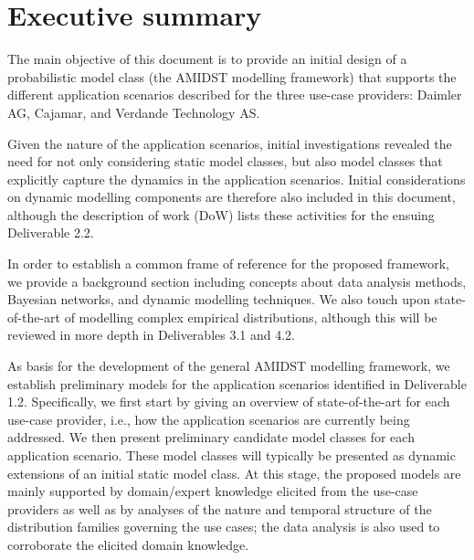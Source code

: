 \section{Executive summary}\label{section:executiveSummary}

The main objective of this document is to provide an initial design of a probabilistic model class (the AMIDST modelling
framework) that supports the different application scenarios described for the three use-case providers: Daimler AG, Cajamar, and Verdande Technology AS.



Given the nature of the application scenarios, initial investigations revealed the need for not only considering static
model classes, but also model classes that explicitly capture the  dynamics in the application scenarios. Initial considerations on
dynamic modelling components are therefore also included in this document, although the description of work (DoW)
lists these activities for the ensuing Deliverable 2.2. 

In order to establish a common frame of reference for the proposed framework, we provide a background section including
concepts about data analysis methods, Bayesian networks, and dynamic modelling techniques. We also touch upon
state-of-the-art of modelling complex empirical distributions, although this will be reviewed in more depth in Deliverables
3.1 and 4.2. 

As basis for the development of the general AMIDST modelling framework, we establish preliminary models for the application scenarios identified in
Deliverable 1.2. Specifically, we first start by giving an overview of state-of-the-art for each use-case provider, i.e., how the
application scenarios are currently being addressed. We then present preliminary candidate model classes for each
application scenario. These model classes will typically be presented as dynamic extensions of an initial static model class. At
this stage, the proposed models are mainly supported by  domain/expert knowledge elicited from the use-case providers
as well as by analyses of the nature and temporal structure of the distribution families governing the use cases; the data
analysis is also used to corroborate the elicited domain knowledge.

